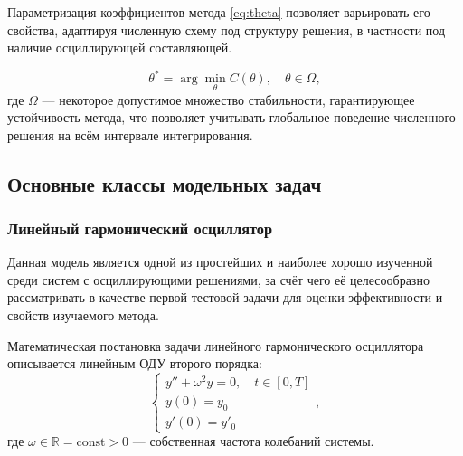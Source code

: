 Параметризация коэффициентов метода \eqref{eq:theta} позволяет варьировать его свойства, адаптируя численную схему под структуру решения, в частности под наличие осциллирующей составляющей. 

\begin{equation}
	\label{eq:opt_problem}
	\theta^* = \arg\min_{\theta} C(\theta), \quad \theta \in \Omega,
\end{equation}
где $\Omega$ — некоторое допустимое множество стабильности, гарантирующее устойчивость метода, что позволяет учитывать глобальное поведение численного решения на всём интервале интегрирования.

\subsection{Основные классы модельных задач}
\label{subsec:representative_problems}
\subsubsection{Линейный гармонический осциллятор}
Данная модель является одной из простейших и наиболее хорошо изученной среди систем с осциллирующими решениями, за счёт чего её целесообразно рассматривать в качестве первой тестовой задачи для оценки эффективности и свойств изучаемого метода.

Математическая постановка задачи линейного гармонического осциллятора описывается линейным ОДУ второго порядка:
\begin{equation}
	\label{eq:oscillator}
	\begin{cases}
		y'' + \omega^2 y = 0, \quad t \in [0, T] \\
		y(0) = y_0 \\
		y'(0) = y'_0
	\end{cases},
\end{equation}
где $\omega \in \mathbb{R} = \text{const} > 0$ — собственная частота колебаний системы.

